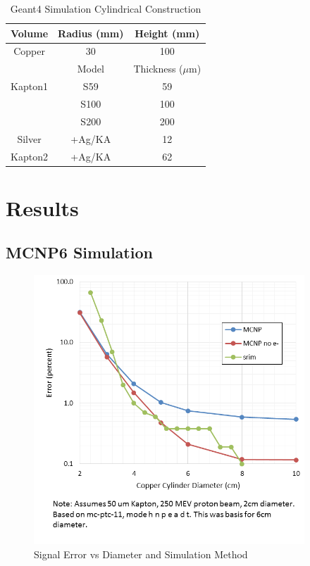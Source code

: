\documentclass{mc2015}
\begin{document}
\begin{table}[H]
  \centering
  \caption{Geant4 Simulation Cylindrical Construction}
  \begin{tabular}{ccc}
    \toprule
    Volume  & Radius (mm) & Height (mm) \\
    \midrule
    Copper  & \num{30} & \num{100} \\
    \toprule\toprule
            & Model    & Thickness ($\mu$m) \\
    \midrule
    Kapton1 & S59      & \num{59}  \\
            & S100     & \num{100} \\
            & S200     & \num{200} \\
    Silver  & +Ag/KA   & \num{12}  \\
    Kapton2 & +Ag/KA   & \num{62}  \\
    \bottomrule
  \end{tabular}
  \label{tab:geant4setup}
\end{table}


\section{Results}



\subsection{MCNP6 Simulation}

\begin{figure}[H]
  \centering
  \includegraphics[width=4in]{figures/fig_error_diameter.png}
  \caption{Signal Error vs Diameter and Simulation Method}
  \label{fig:error_diameter}
\end{figure}
\end{document}
